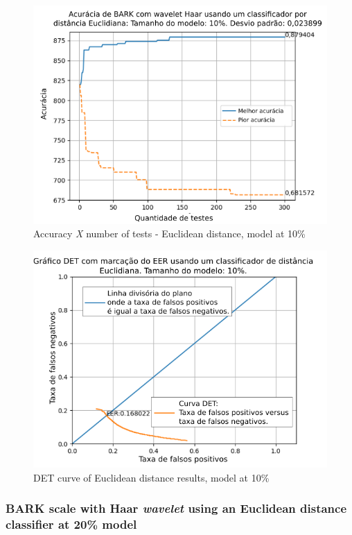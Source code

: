 			\begin{figure}[!h]
				\centering
				\includegraphics[width=\linewidth]{images/results/confusionMatrices/classifier_Euclidian_10}
				\caption{Accuracy \textit{X} number of tests - Euclidean distance, model at 10\%}
				\label{fig:classifiereuclidian10}
			\end{figure}
			
			\begin{figure}[!h]
				\centering
				\includegraphics[width=.9\linewidth]{images/results/det/DET_for_classifier_Euclidian_10}
				\caption{DET curve of Euclidean distance results, model at 10\% }
				\label{fig:detforclassifiereuclidian10}
			\end{figure}
		
		\subsubsection{BARK scale with Haar \textit{wavelet} using an Euclidean distance classifier at 20\% model}
		
